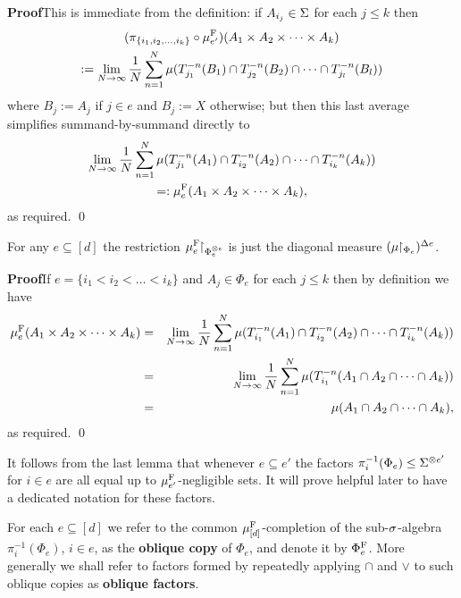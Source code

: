 \documentclass[12pt]{article}
\begin{document}
\textbf{Proof}\quad This is immediate from the definition: if
$A_{i_j} \in \S$ for each $j \leq k$ then
\begin{multline*}
(\pi_{\{i_1,i_2,\ldots,i_k\}}\circ\mu^{\rm{F}}_{e'})(A_1\times A_2\times \cdots\times A_k)\\
:= \lim_{N\to
\infty}\frac{1}{N}\sum_{n=1}^N\mu(T_{j_1}^{-n}(B_1)\cap
T_{j_2}^{-n}(B_2)\cap\cdots\cap T_{j_l}^{-n}(B_l))
\end{multline*}
where $B_j := A_j$ if $j \in e$ and $B_j := X$ otherwise; but then
this last average simplifies summand-by-summand directly to
\begin{multline*}
\lim_{N\to \infty}\frac{1}{N}\sum_{n=1}^N\mu(T_{j_1}^{-n}(A_1)\cap
T_{i_2}^{-n}(A_2)\cap\cdots\cap T_{i_k}^{-n}(A_k))\\
=: \mu^{\rm{F}}_e(A_1\times A_2\times \cdots\times A_k),
\end{multline*}
as required. \qed

\begin{lem}\label{lem:diag}
For any $e \subseteq [d]$ the restriction
$\mu^{\rm{F}}_e\uhr_{\Phi_e^{\otimes e}}$ is just the diagonal
measure $(\mu\uhr_{\Phi_e})^{\Delta e}$.
\end{lem}

\textbf{Proof}\quad If $e = \{i_1 < i_2 < \ldots < i_k\}$ and $A_j
\in \Phi_e$ for each $j \leq k$ then by definition we have
\begin{eqnarray*}\mu^{\rm{F}}_e(A_1 \times A_2\times \cdots\times A_k) &=& \lim_{N\to \infty}\frac{1}{N}\sum_{n=1}^N\mu(T_{i_1}^{-n}(A_1)\cap T_{i_2}^{-n}(A_2)\cap\cdots\cap
T_{i_k}^{-n}(A_k))\\
&=& \lim_{N\to
\infty}\frac{1}{N}\sum_{n=1}^N\mu(T_{i_1}^{-n}(A_1\cap
A_2\cap\cdots\cap A_k))\\
&=& \mu(A_1\cap A_2\cap\cdots\cap A_k),
\end{eqnarray*}
as required. \qed

It follows from the last lemma that whenever $e \subseteq e'$ the
factors $\pi_i^{-1}(\Phi_e) \leq \S^{\otimes e'}$ for $i\in e$ are
all equal up to $\mu^{\rm{F}}_{e'}$-negligible sets.  It will prove
helpful later to have a dedicated notation for these factors.

\begin{dfn}
For each $e \subseteq [d]$ we refer to the common
$\mu^{\rm{F}}_{[d]}$-completion of the sub-$\s$-algebra
$\pi_i^{-1}(\Phi_e)$, $i \in e$, as the \textbf{oblique copy} of
$\Phi_e$, and denote it by $\Phi^{\rm{F}}_e$.  More generally we
shall refer to factors formed by repeatedly applying $\cap$ and
$\vee$ to such oblique copies as \textbf{oblique factors}.
\end{dfn}
\end{document}
